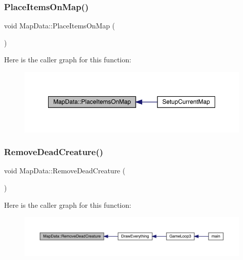 \subsubsection{\texorpdfstring{Place\+Items\+On\+Map()}{PlaceItemsOnMap()}}
{\footnotesize\ttfamily void Map\+Data\+::\+Place\+Items\+On\+Map (\begin{DoxyParamCaption}{ }\end{DoxyParamCaption})}

Here is the caller graph for this function\+:
\nopagebreak
\begin{figure}[H]
\begin{center}
\leavevmode
\includegraphics[width=350pt]{de/d83/class_map_data_aae575fa856f1d179220c4781873fd635_icgraph}
\end{center}
\end{figure}
\mbox{\label{class_map_data_a737946a4648a34f99452a6bff1b727f6}} 
\subsubsection{\texorpdfstring{Remove\+Dead\+Creature()}{RemoveDeadCreature()}}
{\footnotesize\ttfamily void Map\+Data\+::\+Remove\+Dead\+Creature (\begin{DoxyParamCaption}{ }\end{DoxyParamCaption})}

Here is the caller graph for this function\+:
\nopagebreak
\begin{figure}[H]
\begin{center}
\leavevmode
\includegraphics[width=350pt]{de/d83/class_map_data_a737946a4648a34f99452a6bff1b727f6_icgraph}
\end{center}
\end{figure}
\mbox{\label{class_map_data_ad62fed28a640928527502b00b291aabd}} 
